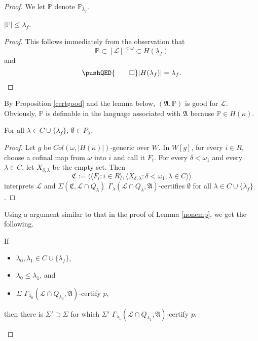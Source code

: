 \documentclass[12pt]{article}
\numberwithin{equation}{section}
\begin{document}
\begin{proof}
We let $\mathbb{P}$ denote $\mathbb{P}_{\lambda_f}$. 

\begin{lem}\label{size}
$|\mathbb{P}| \leq \lambda_f$.
\end{lem}

\begin{proof}
This follows immediately from the observation that $$\mathbb{P} \subset [\mathcal{L}]^{<\omega} \subset H(\lambda_f)$$ and 
\begin{equation*}
    \pushQED{\qed} 
    |H(\lambda_f)| = \lambda_f \text{.} \qedhere
\end{equation*}
\end{proof}

By Proposition \ref{certgood} and the lemma below, $(\mathfrak{A}, \mathbb{P})$ is good for $\mathcal{L}$. Obviously, $\mathbb{P}$ is definable in the language associated with $\mathfrak{A}$ because $\mathbb{P} \in H(\kappa)$.

\begin{lem}\label{nonemp}
For all $\lambda \in C \cup \{\lambda_f\}$, $\emptyset \in P_{\lambda}$.
\end{lem}

\begin{proof}
Let $g$ be $Col(\omega, |H(\kappa)|)$-generic over $W$. In $W[g]$, for every $i \in R$, choose a cofinal map from $\omega$ into $i$ and call it $F_i$. For every $\delta < \omega_1$ and every $\lambda \in C$, let $X_{\delta, \lambda}$ be the empty set. Then $$\mathfrak{C} := \langle \langle F_i : i \in R \rangle, \langle X_{\delta, \lambda} : \delta < \omega_1, \lambda \in C \rangle \rangle$$ interprets $\mathcal{L}$ and $\Sigma(\mathfrak{C}, \mathcal{L} \cap Q_{\lambda})$ $\Gamma_{\lambda} (\mathcal{L} \cap Q_{\lambda}, \mathfrak{A})$-certifies $\emptyset$ for all $\lambda \in C \cup \{\lambda_f\}$.  
\end{proof}

Using a argument similar to that in the proof of Lemma \ref{nonemp}, we get the following.

\begin{lem}\label{extcert}
If 
\begin{itemize}
    \item $\lambda_0, \lambda_1 \in C \cup \{\lambda_f\}$, 
    \item $\lambda_0 \leq \lambda_1$, and 
    \item $\Sigma$ $\Gamma_{\lambda_0} (\mathcal{L} \cap Q_{\lambda_0}, \mathfrak{A})$-certify $p$, 
\end{itemize}
then there is $\Sigma' \supset \Sigma$ for which $\Sigma'$ $\Gamma_{\lambda_1} (\mathcal{L} \cap Q_{\lambda_1}, \mathfrak{A})$-certify $p$.
\end{lem}


\end{proof}
\end{document}
